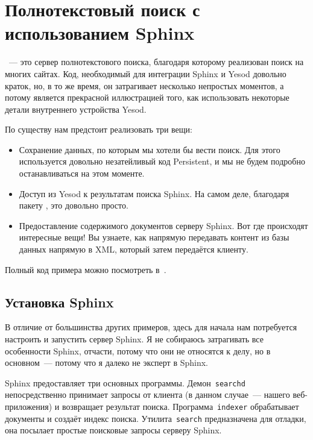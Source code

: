 \chapter{Полнотекстовый поиск с использованием Sphinx}\label{chap:sphinx}
~--- это сервер полнотекстового
поиска, благодаря которому реализован поиск на многих сайтах. Код, необходимый
для интеграции Sphinx и Yesod довольно краток, но, в то же время, он
затрагивает несколько непростых моментов, а потому является прекрасной
иллюстрацией того, как использовать некоторые детали внутреннего устройства
Yesod.

По существу нам предстоит реализовать три вещи:
\begin{itemize}
  \item Сохранение данных, по которым мы хотели бы вести поиск. Для этого
      используется довольно незатейливый код Persistent, и мы не будем подробно
      останавливаться на этом моменте.

  \item Доступ из Yesod к результатам поиска Sphinx. На самом деле, благодаря
      пакету ,
      это довольно просто.

  \item Предоставление содержимого документов серверу Sphinx. Вот где
      происходят интересные вещи! Вы узнаете, как напрямую передавать контент
      из базы данных напрямую в XML, который затем передаётся клиенту.
\end{itemize}

Полный код примера можно посмотреть
в~.

\section{Установка Sphinx}
В отличие от большинства других примеров, здесь для начала нам потребуется
настроить и запустить сервер Sphinx. Я не собираюсь затрагивать все особенности
Sphinx, отчасти, потому что они не относятся к делу, но в основном~--- потому
что я далеко не эксперт в Sphinx.

Sphinx предоставляет три основных программы. Демон~\lstinline!searchd!
непосредственно принимает запросы от клиента (в данном случае~--- нашего
веб-приложения) и возвращает результат поиска. Программа~\lstinline!indexer!
обрабатывает документы и создаёт индекс поиска. Утилита~\lstinline!search!
предназначена для отладки, она посылает простые поисковые запросы серверу
Sphinx.

